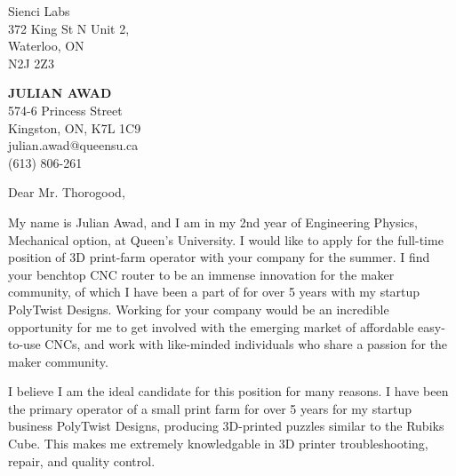 \documentclass[11pt]{letter} %
\begin{document}
\begin{letter}{Sienci Labs \\
 372 King St N Unit 2,\\
 Waterloo, ON \\
 N2J 2Z3}

\begin{center}
\textbf{\huge JULIAN AWAD} \\ %
\vspace{1em} %
574-6 Princess Street \\ Kingston, ON, K7L 1C9 \\ julian.awad@queensu.ca \\ (613) 806-261 %
\end{center}
\hspace{2em}
\signature{Julian Awad} %
\vspace{-0.3in}
\opening{Dear Mr. Thorogood,}

My name is Julian Awad, and I am in my 2nd year of Engineering Physics, Mechanical option, at Queen's University. I would like to apply for the full-time position of 3D print-farm operator with your company for the summer. I find your benchtop CNC router to be an immense innovation for the maker community, of which I have been a part of for over 5 years with my startup PolyTwist Designs. Working for your company would be an incredible opportunity for me to get involved with the emerging market of affordable easy-to-use CNCs, and work with like-minded individuals who share a passion for the maker community.

I believe I am the ideal candidate for this position for many reasons. I have been the primary operator of a small print farm for over 5 years for my startup business PolyTwist Designs, producing 3D-printed puzzles similar to the Rubiks Cube. This makes me extremely knowledgable in 3D printer troubleshooting, repair, and quality control.


\end{letter}
\end{document}
